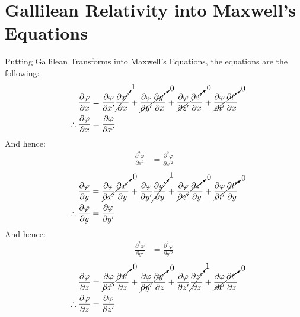 \documentclass[letterpaper]{article}
\begin{document}
\section{Gallilean Relativity into Maxwell's Equations}
Putting Gallilean Transforms into Maxwell's Equations, the equations
are the following:
\begin{align*}
\frac{\partial\varphi}{\partial x} &= \frac{\partial\varphi}{\partial x^\prime}\cancelto{1}{\frac{\partial x^\prime}{\partial x}}
+\cancelto{0}{\frac{\partial\varphi}{\partial y^\prime}\frac{\partial y^\prime}{\partial x}}
+\cancelto{0}{\frac{\partial\varphi}{\partial z^\prime}\frac{\partial z^\prime}{\partial x}}
+\cancelto{0}{\frac{\partial\varphi}{\partial t^\prime}\frac{\partial t^\prime}{\partial x}}
\\\therefore
\frac{\partial\varphi}{\partial x} &= \frac{\partial\varphi}{\partial x^\prime}
\end{align*}
And hence:
\begin{align*}
\frac{\partial^2\varphi}{\partial x^2} &= \frac{\partial^2\varphi}{\partial x^{\prime 2}}
\end{align*}
\begin{align*}
\frac{\partial\varphi}{\partial y} &= \cancelto{0}{\frac{\partial\varphi}{\partial x^\prime}\frac{\partial x^\prime}{\partial y}}
+\frac{\partial\varphi}{\partial y^\prime}\cancelto{1}{\frac{\partial y^\prime}{\partial y}}
+\cancelto{0}{\frac{\partial\varphi}{\partial z^\prime}\frac{\partial z^\prime}{\partial y}}
+\cancelto{0}{\frac{\partial\varphi}{\partial t^\prime}\frac{\partial t^\prime}{\partial y}}
\\\therefore
\frac{\partial\varphi}{\partial y} &= \frac{\partial\varphi}{\partial y^\prime}
\end{align*}
And hence:
\begin{align*}
\frac{\partial^2\varphi}{\partial y^2} &= \frac{\partial^2\varphi}{\partial y^{\prime 2}}
\end{align*}
\begin{align*}
\frac{\partial\varphi}{\partial z} &= \cancelto{0}{\frac{\partial\varphi}{\partial x^\prime}\frac{\partial x^\prime}{\partial z}}
+\cancelto{0}{\frac{\partial\varphi}{\partial y^\prime}\frac{\partial y^\prime}{\partial z}}
+\frac{\partial\varphi}{\partial z^\prime}\cancelto{1}{\frac{\partial z^\prime}{\partial z}}
+\cancelto{0}{\frac{\partial\varphi}{\partial t^\prime}\frac{\partial t^\prime}{\partial z}}
\\\therefore
\frac{\partial\varphi}{\partial z} &= \frac{\partial\varphi}{\partial z^\prime}
\end{align*}
\end{document}
